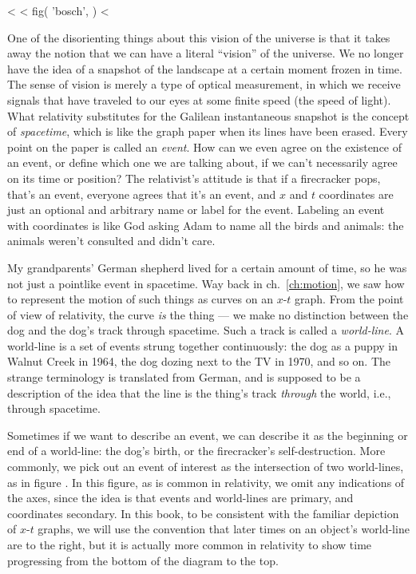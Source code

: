 <%
<%
  fig(
    'bosch',
  )
<%

One of the disorienting things about this vision of the universe is that it takes away the notion
that we can have a literal ``vision'' of the universe. We no longer have the idea of a
snapshot of the landscape at a certain moment frozen in time. The sense of vision is merely
a type of optical measurement, in which we receive signals that have traveled to our eyes
at some finite speed (the speed of light). What relativity substitutes for the Galilean
instantaneous snapshot is the concept of \emph{spacetime}, which is like the graph paper
when its lines have been erased. Every point on the paper is called an \emph{event}. How can we
even agree on the existence of an event, or define which one we are talking about, if we can't
necessarily agree on its time or position? The relativist's attitude is that if a firecracker
pops, that's an event, everyone agrees that it's an event, and $x$ and $t$ coordinates are just
an optional and arbitrary name or label for the event. Labeling an event with coordinates is like
God asking Adam to name all the birds and animals: the animals weren't consulted and didn't care.

My grandparents' German shepherd lived for a certain amount of time, so he was
not just a pointlike event
in spacetime. Way back in ch.~\ref{ch:motion}, we saw how to represent the motion of such things
as curves on an $x$-$t$ graph. From the point of view of relativity, the curve \emph{is} the thing ---
we make no distinction between the dog and the dog's track through spacetime. Such a track is called
a \emph{world-line}. A world-line is a set of events strung together continuously:
the dog as a puppy in Walnut Creek in 1964, the dog dozing next to the TV in 1970, and so on. The
strange terminology is translated from German, and is supposed to be a description of the idea that
the line is the thing's track \emph{through} the world, i.e., through spacetime.

Sometimes if we want to describe an event, we can describe it as the beginning or end of a world-line:
the dog's birth, or the firecracker's self-destruction. More commonly, we pick out an event of interest
as the intersection of two world-lines, as in figure . In this figure, as is
common in relativity, we omit any indications of the axes, since the idea is that events and world-lines
are primary, and coordinates secondary. In this book, to be consistent with the familiar depiction of
$x$-$t$ graphs, we will use the convention that
later times on an object's world-line are to the right, but it is actually more common in relativity to
show time progressing from the bottom of the diagram to the top.

